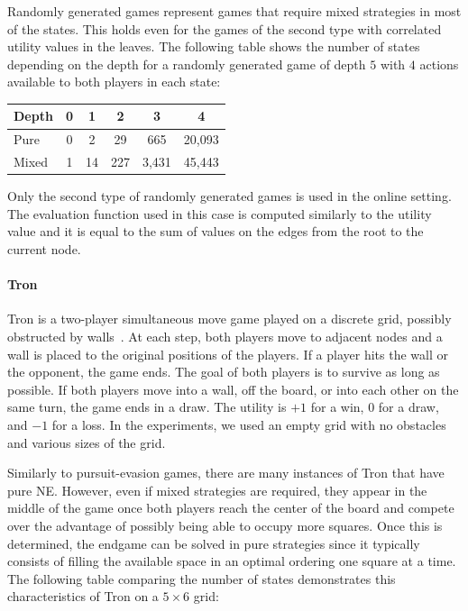 Randomly generated games represent games that require mixed strategies in most of the states.
This holds even for the games of the second type with correlated utility values in the leaves.
The following table shows the number of states depending on the depth for a randomly generated game of depth $5$ with $4$ actions available to both players in each state:

\vspace{0.1cm}

\begin{center}
\small
\begin{tabular}{|l|c|c|c|c|c|}
\hline Depth & 0 & 1 & 2 & 3 & 4 \\
\hline Pure  & 0 & 2 & 29 & 665 & 20,093 \\
\hline Mixed & 1 & 14 & 227 & 3,431 & 45,443 \\
\hline
\end{tabular}
\end{center}

\vspace{0.1cm}

Only the second type of randomly generated games is used in the online setting.
The evaluation function used in this case is computed similarly to the utility value and it is equal to the sum of values on the edges from the root to the current node.

\paragraph{\textbf{Tron}}
Tron is a two-player simultaneous move game played on a discrete grid, possibly obstructed by
walls~\cite{Samothrakis10Tron,Perick12Comparison,Lanctot13Tron}.
At each step, both players move to adjacent nodes and a wall is placed to the original positions of the players.
If a player hits the wall or the opponent, the game ends.
The goal of both players is to survive as long as possible.
If both players move into a wall, off the board, or into each other on the same turn, the game ends in a draw.
The utility is $+1$ for a win, $0$ for a draw, and $-1$ for a loss.
In the experiments, we used an empty grid with no obstacles and various sizes of the grid.

Similarly to pursuit-evasion games, there are many instances of Tron that have pure NE.
However, even if mixed strategies are required, they appear in the middle of the game once both players reach the center of the board and compete over the advantage of possibly being able to occupy more squares.
Once this is determined, the endgame can be solved in pure strategies since it typically consists of filling the available space in an optimal ordering one square at a time.
The following table comparing the number of states demonstrates this characteristics of Tron on a $5\times6$ grid:

